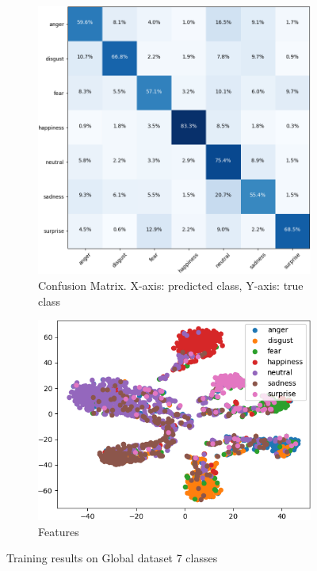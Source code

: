 \begin{figure}[H]
    \centering
    \begin{subfigure}{0.37\textwidth}
        \centering
        \includegraphics[width=\linewidth]{Images/conf_mat/conf_mat_Global_7.png}
        \caption{Confusion Matrix. \footnotesize{X-axis: predicted class, Y-axis: true class}}
        \label{conf_mat_Global_7}
    \vspace{0.15cm}
    \end{subfigure}
    \hspace{0.05\textwidth} %
    \begin{subfigure}{0.39\textwidth}
        \centering
        \includegraphics[width=\linewidth]{Images/Features/feat_Global_7.png}
        \caption{Features}
        \label{feat_Global_7}
    \end{subfigure}
    \caption{Training results on Global dataset 7 classes}
    \label{Global_confusion}
\end{figure}
        


